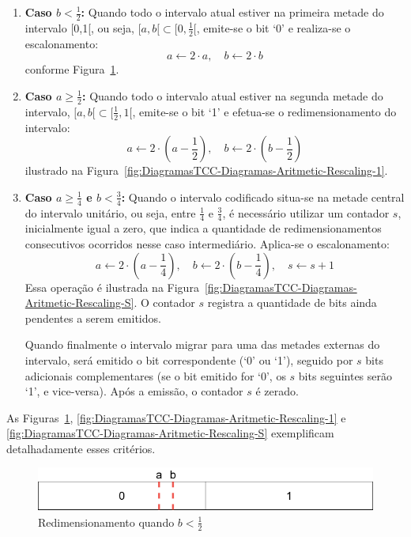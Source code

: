 \begin{enumerate}
    \item \textbf{Caso \( b < \frac{1}{2} \):} 
    Quando todo o intervalo atual estiver na primeira metade do intervalo [0,1[, ou seja, \( [a,b[ \subset [0,\frac{1}{2}[ \), emite-se o bit `0' e realiza-se o escalonamento:
    \[
    a \leftarrow 2 \cdot a, \quad b \leftarrow 2 \cdot b
    \]
    conforme Figura~\ref{fig:DiagramasTCC-Diagramas-Aritmetic-Rescaling-0}.

    \item \textbf{Caso \( a \geq \frac{1}{2} \):}
    Quando todo o intervalo atual estiver na segunda metade do intervalo, \( [a,b[ \subset [\frac{1}{2},1[ \), emite-se o bit `1' e efetua-se o redimensionamento do intervalo:
    \[
    a \leftarrow 2 \cdot \left(a - \frac{1}{2}\right), \quad b \leftarrow 2 \cdot \left(b - \frac{1}{2}\right)
    \]
    ilustrado na Figura~\ref{fig:DiagramasTCC-Diagramas-Aritmetic-Rescaling-1}.

    \item \textbf{Caso \( a \geq \frac{1}{4} \) e \( b < \frac{3}{4} \):}
    Quando o intervalo codificado situa-se na metade central do intervalo unitário, ou seja, entre \( \frac{1}{4} \) e \( \frac{3}{4} \), é necessário utilizar um contador \( s \), inicialmente igual a zero, que indica a quantidade de redimensionamentos consecutivos ocorridos nesse caso intermediário. Aplica-se o escalonamento:
    \[
    a \leftarrow 2 \cdot \left(a - \frac{1}{4}\right), \quad b \leftarrow 2 \cdot \left(b - \frac{1}{4}\right), \quad s \leftarrow s + 1
    \]
    Essa operação é ilustrada na Figura~\ref{fig:DiagramasTCC-Diagramas-Aritmetic-Rescaling-S}. O contador \( s \) registra a quantidade de bits ainda pendentes a serem emitidos.

    Quando finalmente o intervalo migrar para uma das metades externas do intervalo, será emitido o bit correspondente (`0' ou `1'), seguido por \( s \) bits adicionais complementares (se o bit emitido for `0', os \( s \) bits seguintes serão `1', e vice-versa). Após a emissão, o contador \( s \) é zerado.

\end{enumerate}

As Figuras~\ref{fig:DiagramasTCC-Diagramas-Aritmetic-Rescaling-0}, \ref{fig:DiagramasTCC-Diagramas-Aritmetic-Rescaling-1} e \ref{fig:DiagramasTCC-Diagramas-Aritmetic-Rescaling-S} exemplificam detalhadamente esses critérios.

\begin{figure}[ht]
	\centering
	\caption{Redimensionamento quando \( b < \frac{1}{2} \)}
	\label{fig:DiagramasTCC-Diagramas-Aritmetic-Rescaling-0}
	\includegraphics[width=12cm]{figuras/DiagramasTCC-Diagramas-Aritmetic-Rescaling-0}
\end{figure}

